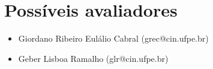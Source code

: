 \chapter{Possíveis avaliadores}

\begin{itemize}
    \item Giordano Ribeiro Eulálio Cabral (grec@cin.ufpe.br)
    \item Geber Lisboa Ramalho (glr@cin.ufpe.br)
\end{itemize}
